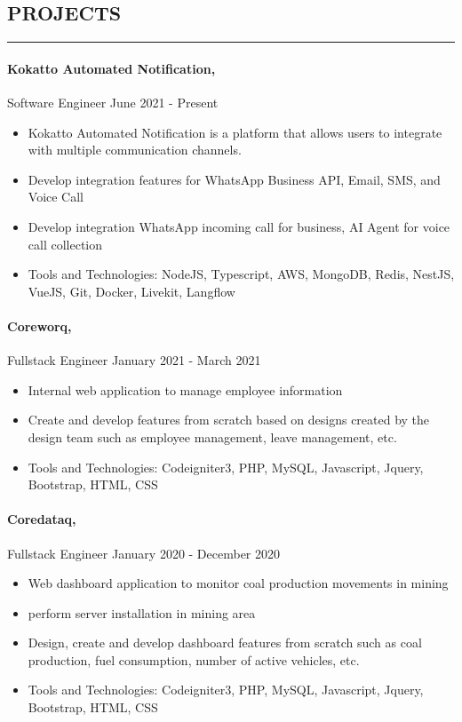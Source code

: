 \documentclass{article}
\begin{document}
\subsection*{PROJECTS}
\vspace{-0.1em}
\hrule
\vspace{0.4em}
\paragraph{Kokatto Automated Notification,} Software Engineer \hfill June 2021 - Present
\vspace{-0.5em}
\begin{itemize}
    \setlength{\itemsep}{-0.3em}
    \item Kokatto Automated Notification is a platform that allows users to integrate with multiple communication channels.
    \item Develop integration features for WhatsApp Business API, Email, SMS, and Voice Call
    \item Develop integration WhatsApp incoming call for business, AI Agent for voice call collection
    \item Tools and Technologies: NodeJS, Typescript, AWS, MongoDB, Redis, NestJS, VueJS, Git, Docker, Livekit, Langflow
\end{itemize}
\vspace{-2em}
\paragraph{Coreworq,} Fullstack Engineer \hfill January 2021 - March 2021
\vspace{-0.5em}
\begin{itemize}
    \setlength{\itemsep}{-0.3em}
    \item Internal web application to manage employee information
    \item Create and develop features from scratch based on designs created by the design team such as employee management, leave management, etc.
    \item Tools and Technologies: Codeigniter3, PHP, MySQL, Javascript, Jquery, Bootstrap, HTML, CSS
\end{itemize}
\vspace{-2em}
\paragraph{Coredataq,} Fullstack Engineer \hfill January 2020 - December 2020
\vspace{-0.5em}
\begin{itemize}
    \setlength{\itemsep}{-0.3em}
    \item Web dashboard application to monitor coal production movements in mining
    \item perform server installation in mining area
    \item Design, create and develop dashboard features from scratch such as coal production, fuel consumption, number of active vehicles, etc.
    \item Tools and Technologies: Codeigniter3, PHP, MySQL, Javascript, Jquery, Bootstrap, HTML, CSS
\end{itemize}
\end{document}
